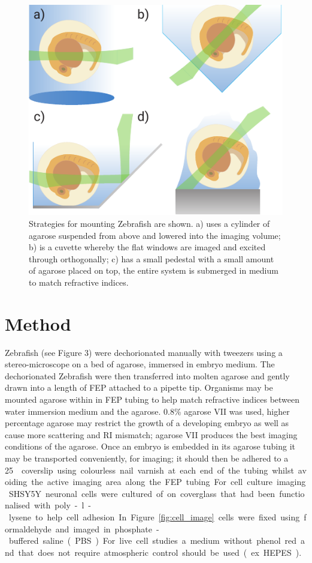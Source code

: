 \begin{figure}
    \centering
    \includegraphics{./mounting_straegies_fish_cartoon}
    \caption{Strategies for mounting Zebrafish are shown.
    a) uses a cylinder of agarose suspended from above and lowered into the imaging volume;
    b) is a cuvette whereby the flat windows are imaged and excited through orthogonally;
    c) has a small pedestal with a small amount of agarose placed on top, the entire system is submerged in medium to match refractive indices.}
    \label{fig:mounting_straegies_fish}
\end{figure}

\section{Method}

Zebrafish (see Figure 3) were dechorionated manually with tweezers using a stereo-microscope on a bed of agarose, immersed in embryo medium.
The dechorionated Zebrafish were then transferred into molten agarose and gently drawn into a length of FEP attached to a pipette tip.
Organisms may be mounted agarose within in FEP tubing to help match refractive indices between water immersion medium and the agarose.
0.8\% agarose VII was used, higher percentage agarose may restrict the growth of a developing embryo as well as cause more scattering and RI mismatch; agarose VII produces the best imaging conditions of the agarose\cite{4}.
Once an embryo is embedded in its agarose tubing it may be transported conveniently, for imaging; it should then be adhered to a \SI{25}{\milli\metre\square} coverslip using colourless nail varnish at each end of the tubing whilst avoiding the active imaging area along the FEP tubing.
For cell culture imaging SHSY5Y neuronal cells were cultured of on coverglass that had been functionalised with poly-l-lysene to help cell adhesion.
In Figure \ref{fig:cell_image} cells were fixed using formaldehyde and imaged in phosphate-buffered saline (PBS).
For live cell studies a medium without phenol red and that does not require atmospheric control should be used (ex. HEPES).


